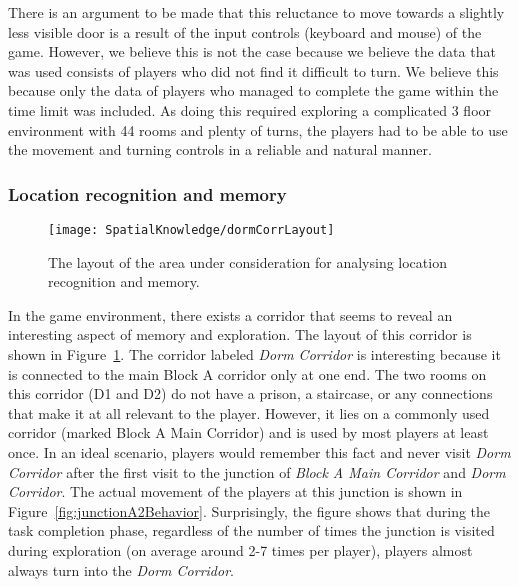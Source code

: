 There is an argument to be made that this reluctance to move towards a slightly less visible door is a result of the input controls (keyboard and mouse) of the game. However, we believe this is not the case because we believe the data that was used consists of players who did not find it difficult to turn. We believe this because only the data of players who managed to complete the game within the time limit was included. As doing this required exploring a complicated 3 floor environment with 44 rooms and plenty of turns, the players had to be able to use the movement and turning controls in a reliable and natural manner.




\subsubsection{Location recognition and memory} %
\label{sec:on_memory_and_exploration}

\begin{figure}[!tb]
    \begin{center}
        \texttt{[image: SpatialKnowledge/dormCorrLayout]}
    \end{center}
    \caption[Layout of dorm corridor]{The layout of the area under consideration for analysing location recognition and memory.}
    \label{fig:dormCorrLayout}
\end{figure}

In the game environment, there exists a corridor that seems to reveal an interesting aspect of memory and exploration. The layout of this corridor is shown in Figure~\ref{fig:dormCorrLayout}. The corridor labeled \emph{Dorm Corridor} is interesting because it is connected to the main Block A corridor only at one end. The two rooms on this corridor (D1 and D2) do not have a prison, a staircase, or any connections that make it at all relevant to the player. However, it lies on a commonly used corridor (marked Block A Main Corridor) and is used by most players at least once. In an ideal scenario, players would remember this fact and never visit \emph{Dorm Corridor} after the first visit to the junction of \emph{Block A Main Corridor} and \emph{Dorm Corridor}. The actual movement of the players at this junction is shown in Figure~\ref{fig:junctionA2Behavior}. Surprisingly, the figure shows that during the task completion phase, regardless of the number of times the junction is visited during exploration (on average around 2-7 times per player), players almost always turn into the \emph{Dorm Corridor}.

